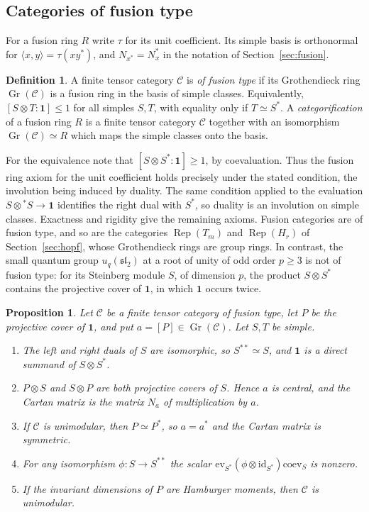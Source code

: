 \documentclass[11pt,reqno]{amsart}
\newtheorem{proposition}[theorem]{Proposition}
\theoremstyle{definition}
\newtheorem{definition}[theorem]{Definition}
\newcommand{\one}{\mathbf 1}
\newcommand{\C}{\mathcal C}
\newcommand{\Rep}{\operatorname{Rep}}
\DeclareMathOperator{\Gr}{Gr}
\begin{document}
\subsection{Categories of fusion type}
For a fusion ring $R$ write $\tau$ for its unit coefficient. Its simple basis is orthonormal for $\langle x,y\rangle=\tau(xy^*)$, and $N_{x^*}=N_x^*$ in the notation of Section~\ref{sec:fusion}.

\begin{definition}\label{def:fusion-type}
A finite tensor category $\C$ is \emph{of fusion type} if its Grothendieck ring $\Gr(\C)$ is a fusion ring in the basis of simple classes. Equivalently, $[S\otimes T:\one]\leq1$ for all simples $S,T$, with equality only if $T\simeq S^*$. A \emph{categorification} of a fusion ring $R$ is a finite tensor category $\C$ together with an isomorphism $\Gr(\C)\simeq R$ which maps the simple classes onto the basis.
\end{definition}

For the equivalence note that $[S\otimes S^*:\one]\geq1$, by coevaluation. Thus the fusion ring axiom for the unit coefficient holds precisely under the stated condition, the involution being induced by duality. The same condition applied to the evaluation $S\otimes{}^*S\to\one$ identifies the right dual with $S^*$, so duality is an involution on simple classes. Exactness and rigidity give the remaining axioms. Fusion categories are of fusion type, and so are the categories $\Rep(T_m)$ and $\Rep(H_r)$ of Section~\ref{sec:hopf}, whose Grothendieck rings are group rings. In contrast, the small quantum group $u_q(\mathfrak{sl}_2)$ at a root of unity of odd order $p\geq3$ is not of fusion type: for its Steinberg module $S$, of dimension $p$, the product $S\otimes S^*$ contains the projective cover of $\one$, in which $\one$ occurs twice.

\begin{proposition}\label{prop:fusion-type}
Let $\C$ be a finite tensor category of fusion type, let $P$ be the projective cover of $\one$, and put $a=[P]\in\Gr(\C)$. Let $S,T$ be simple.
\begin{enumerate}
\item The left and right duals of $S$ are isomorphic, so $S^{**}\simeq S$, and $\one$ is a direct summand of $S\otimes S^*$.
\item $P\otimes S$ and $S\otimes P$ are both projective covers of $S$. Hence $a$ is central, and the Cartan matrix is the matrix $N_a$ of multiplication by $a$.
\item If $\C$ is unimodular, then $P\simeq P^*$, so $a=a^*$ and the Cartan matrix is symmetric.
\item For any isomorphism $\phi:S\to S^{**}$ the scalar $\mathrm{ev}_{S^*}(\phi\otimes\mathrm{id}_{S^*})\mathrm{coev}_S$ is nonzero.
\item If the invariant dimensions of $P$ are Hamburger moments, then $\C$ is unimodular.
\end{enumerate}
\end{proposition}
\end{document}
